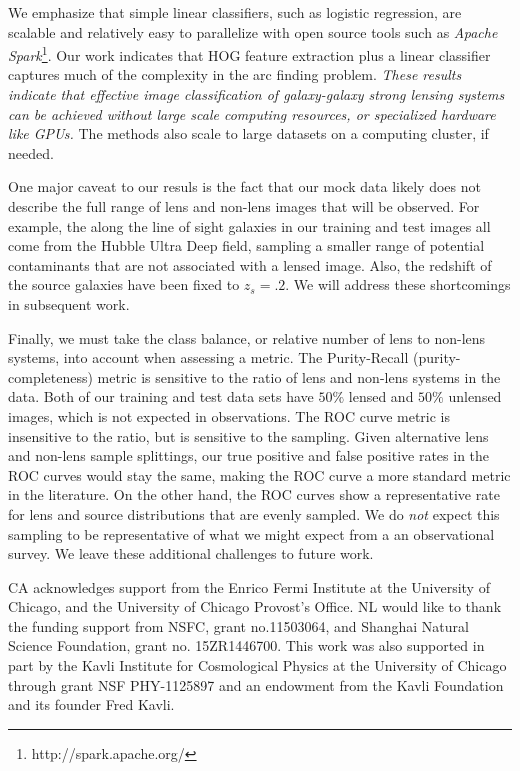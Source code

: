 \documentclass{emulateapj}
\begin{document}
We emphasize that simple linear classifiers, such as logistic
regression, are scalable and relatively easy to parallelize with open
source tools such as {\em Apache Spark}\footnote{http://spark.apache.org/}.
Our work indicates that HOG feature extraction plus a linear
classifier captures much of the complexity in the arc finding problem.
{\it These results indicate that effective image classification of
  galaxy-galaxy strong lensing systems can be achieved without large
  scale computing resources, or specialized hardware like GPUs.}
The methods also scale to large datasets on a computing cluster, if
needed.

One major caveat to our resuls is the fact that our mock data likely
does not describe the full range of lens and non-lens images that will
be observed.  For example, the along the line of sight galaxies in our
training and test images all come from the Hubble Ultra Deep field,
sampling a smaller range of potential contaminants that are not
associated with a lensed image.  Also, the redshift of the source
galaxies have been fixed to $z_s=.2$.  We will address these
shortcomings in subsequent work.

Finally, we must take the class balance, or relative number of lens to
non-lens systems, into account when assessing a metric.  The
Purity-Recall (purity-completeness) metric is sensitive to the ratio
of lens and non-lens systems in the data.  Both of our training and
test data sets have $50\%$ lensed and $50\%$ unlensed images, which is
not expected in observations.  The ROC curve metric is insensitive to
the ratio, but is sensitive to the sampling.  Given alternative lens
and non-lens sample splittings, our true positive and false positive
rates in the ROC curves would stay the same, making the ROC curve a
more standard metric in the literature.  On the other hand, the ROC
curves show a representative rate for lens and source distributions
that are evenly sampled.  We do {\it not} expect this sampling to be
representative of what we might expect from a an observational survey.
We leave these additional challenges to future work.

\acknowledgments CA acknowledges support from the Enrico Fermi
Institute at the University of Chicago, and the University of Chicago
Provost's Office. NL would like to thank the funding support from
NSFC, grant no.11503064, and Shanghai Natural Science Foundation,
grant no. 15ZR1446700. This work was also supported in part by the
Kavli Institute for Cosmological Physics at the University of Chicago
through grant NSF PHY-1125897 and an endowment from the Kavli
Foundation and its founder Fred Kavli.
\lastpagefootnotes
\end{document}
